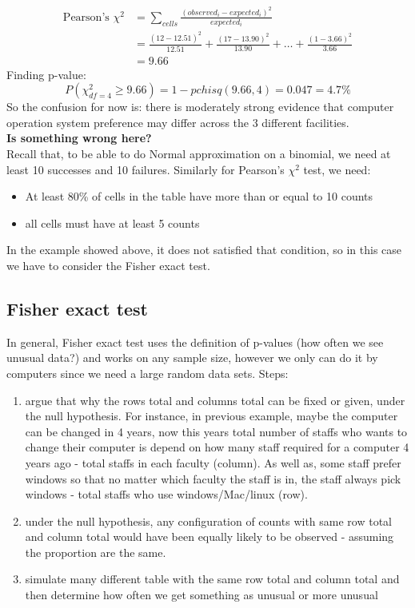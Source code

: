 \documentclass[12pt ]{article}
\begin{document}
\begin{align*}
\text{Pearson's $\chi^2$} &= \sum_{cells} \frac{(observed_{i} - expected_{i})^2}{expected_{i}} \\ 
&= \frac{(12 - 12.51)^2}{12.51} + \frac{(17 - 13.90)^2}{13.90} + \ldots + \frac{(1 - 3.66)^2}{3.66} \\
&= 9.66
\end{align*}
Finding p-value:
\begin{equation*}
P(\chi^2_{df=4} \geq 9.66) = 1 - pchisq(9.66, 4) = 0.047 = 4.7\%
\end{equation*}
So the confusion for now is: there is moderately strong evidence that computer operation system preference may differ across the 3 different facilities. \\

\textbf{Is something wrong here? }\\ 
Recall that, to be able to do Normal approximation on a binomial, we need at least 10 successes and 10 failures. Similarly for Pearson's $\chi^2$ test, we need:
\begin{itemize}
\item At least 80\% of cells in the table have more than or equal to 10 counts
\item all cells must have at least 5 counts
\end{itemize}
In the example showed above, it does not satisfied that condition, so in this case we have to consider the Fisher exact test.

\subsection{Fisher exact test}
In general, Fisher exact test uses the definition of p-values (how often we see unusual data?) and works on any sample size, however we only can do it by computers since we need a large random data sets. Steps:
\begin{enumerate}
\item argue that why the rows total and columns total can be fixed or given, under the null hypothesis. For instance, in previous example, maybe the computer can be changed in 4 years, now this years total number of staffs who wants to change their computer is depend on how many staff required for a computer 4 years ago - total staffs in each faculty (column).  As well as, some staff prefer windows so that no matter which faculty the staff is in, the staff always pick windows - total staffs who use windows/Mac/linux (row).
\item under the null hypothesis, any configuration of counts with same row total and column total would have been equally likely to be observed - assuming the proportion are the same.
\item simulate many different table with the same row total and column total and then determine how often we get something as unusual or more unusual
\end{enumerate}
\end{document}
